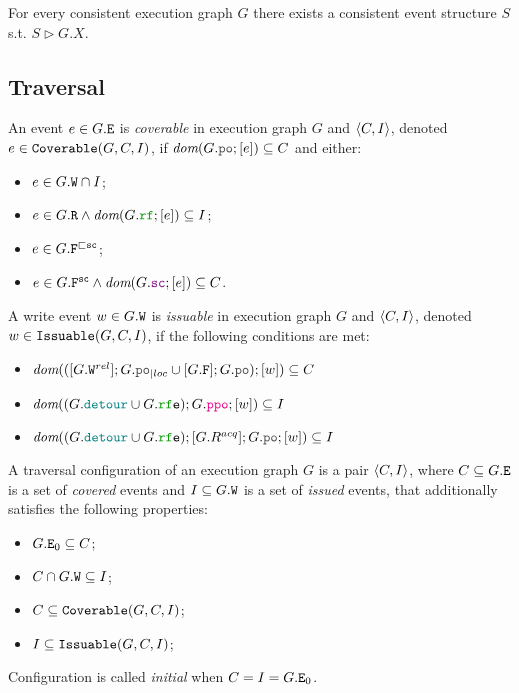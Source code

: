 \documentclass[12pt]{article}
\begin{document}
\begin{theorem}
  For every consistent \imm execution graph $G$
  there exists a consistent event structure $S$
  s.t. $S \rhd G.X$.
\end{theorem}

\subsection{Traversal}

\begin{definition}
  An event $e \in G.{\mathtt{E}}$ is \emph{coverable} in \imm execution graph $G$ and $\langle C, I \rangle$,
  denoted $e \in {\mathtt{Coverable}}(G, C, I)$, 
  if $\dom{G.\lPO;[e]} \subseteq C$ and either:
  \begin{itemize}
    \item $e \in G.{\mathtt{W}} \cap I$;
    \item $e \in G.\lR \wedge \dom{G.\lRF;[e]} \subseteq I$;
    \item $e \in G.{\mathtt{F}}^{\sqsubset{\mathtt{sc}}}$;
    \item $e \in G.\lF^{\sco} \wedge \dom{G.\lSC;[e]} \subseteq C$.
  \end{itemize}
\end{definition}

\begin{definition}
  A write event $w \in G.{\mathtt{W}}$ is \emph{issuable} in \imm execution graph $G$ and $\langle C, I \rangle$,
  denoted $w \in {\mathtt{Issuable}}(G, C, I)$, 
  if the following conditions are met:
  \begin{itemize}
    \item $\dom{([G.\lW^{rel}];\lmakeLoc{G.\lPO} \cup [G.\lF];G.\lPO);[w]} \subseteq C$
    \item $\dom{(G.\lDETOUR \cup G.\lRFE);G.\lPPO;[w]} \subseteq I$
    \item $\dom{(G.\lDETOUR \cup G.\lRFE);[G.R^{acq}];G.\lPO;[w]} \subseteq I$
  \end{itemize}
\end{definition}

\begin{definition}
  A traversal configuration of an \imm execution graph $G$ is a pair $\langle C, I \rangle$, 
  where $C \subseteq G.{\mathtt{E}}$ is a set of \emph{covered} events 
  and $I \subseteq G.{\mathtt{W}}$ is a set of \emph{issued} events,
  that additionally satisfies the following properties:
  \begin{itemize}
    \item $G.{\mathtt{E}}_{0} \subseteq C$;
    \item $C \cap G.{\mathtt{W}} \subseteq I$;
    \item $C \subseteq {\mathtt{Coverable}}(G, C, I)$;
    \item $I \subseteq {\mathtt{Issuable}}(G, C, I)$;
  \end{itemize}
  Configuration is called \emph{initial} when $C = I = G.{\mathtt{E}}_{0}$.
\end{definition}
\end{document}
